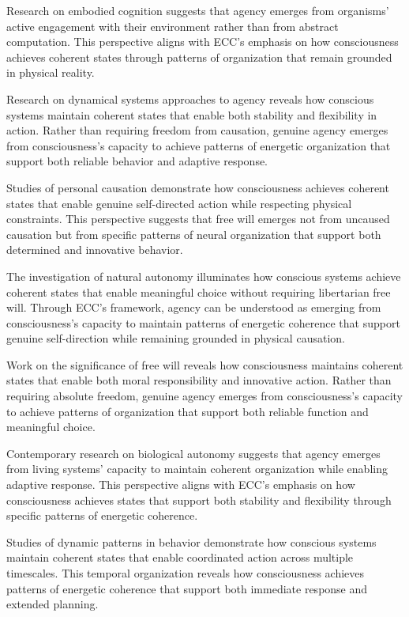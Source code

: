 \begin{refsection}
Research on embodied cognition \cite{Noe2009} suggests that agency emerges from organisms' active engagement with their environment rather than from abstract computation. This perspective aligns with ECC's emphasis on how consciousness achieves coherent states through patterns of organization that remain grounded in physical reality.

Research on dynamical systems approaches to agency \cite{Thompson2007} reveals how conscious systems maintain coherent states that enable both stability and flexibility in action. Rather than requiring freedom from causation, genuine agency emerges from consciousness's capacity to achieve patterns of energetic organization that support both reliable behavior and adaptive response.

Studies of personal causation \cite{OConnor2000} demonstrate how consciousness achieves coherent states that enable genuine self-directed action while respecting physical constraints. This perspective suggests that free will emerges not from uncaused causation but from specific patterns of neural organization that support both determined and innovative behavior.

The investigation of natural autonomy \cite{Walter2001} illuminates how conscious systems achieve coherent states that enable meaningful choice without requiring libertarian free will. Through ECC's framework, agency can be understood as emerging from consciousness's capacity to maintain patterns of energetic coherence that support genuine self-direction while remaining grounded in physical causation.

Work on the significance of free will \cite{Kane1996} reveals how consciousness maintains coherent states that enable both moral responsibility and innovative action. Rather than requiring absolute freedom, genuine agency emerges from consciousness's capacity to achieve patterns of organization that support both reliable function and meaningful choice.

Contemporary research on biological autonomy \cite{Kauffman2000} suggests that agency emerges from living systems' capacity to maintain coherent organization while enabling adaptive response. This perspective aligns with ECC's emphasis on how consciousness achieves states that support both stability and flexibility through specific patterns of energetic coherence.

Studies of dynamic patterns in behavior \cite{Kelso1995} demonstrate how conscious systems maintain coherent states that enable coordinated action across multiple timescales. This temporal organization reveals how consciousness achieves patterns of energetic coherence that support both immediate response and extended planning.


\end{refsection}
